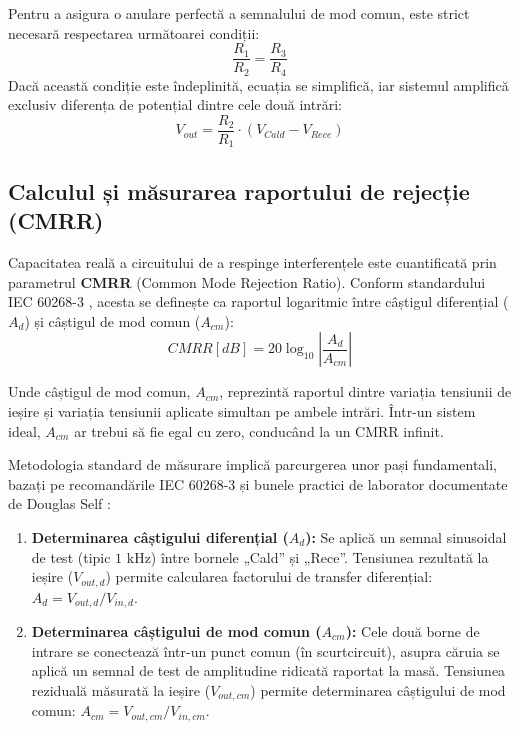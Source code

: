 Pentru a asigura o anulare perfectă a semnalului de mod comun, este strict necesară respectarea următoarei condiții:
\begin{equation}
    \frac{R_1}{R_2} = \frac{R_3}{R_4}
\end{equation}
Dacă această condiție este îndeplinită, ecuația se simplifică, iar sistemul amplifică exclusiv diferența de potențial dintre cele două intrări:
\begin{equation}
    V_{out} = \frac{R_2}{R_1} \cdot (V_{Cald} - V_{Rece})
\end{equation}

\subsection{Calculul și măsurarea raportului de rejecție (CMRR)}
Capacitatea reală a circuitului de a respinge interferențele este cuantificată prin parametrul \textbf{CMRR} (Common Mode Rejection Ratio). Conform standardului IEC 60268-3 \cite{iec60268_3}, acesta se definește ca raportul logaritmic între câștigul diferențial ($A_d$) și câștigul de mod comun ($A_{cm}$):
\begin{equation}
    CMRR [dB] = 20 \log_{10} \left| \frac{A_d}{A_{cm}} \right|
\end{equation}

Unde câștigul de mod comun, $A_{cm}$, reprezintă raportul dintre variația tensiunii de ieșire și variația tensiunii aplicate simultan pe ambele intrări. Într-un sistem ideal, $A_{cm}$ ar trebui să fie egal cu zero, conducând la un CMRR infinit.

Metodologia standard de măsurare implică parcurgerea unor pași fundamentali, bazați pe recomandările IEC 60268-3 \cite{iec60268_3} și bunele practici de laborator documentate de Douglas Self \cite{douglasself}:
\begin{enumerate}
    \item \textbf{Determinarea câștigului diferențial ($A_d$):} Se aplică un semnal sinusoidal de test (tipic $1\text{ kHz}$) între bornele „Cald” și „Rece”. Tensiunea rezultată la ieșire ($V_{out,d}$) permite calcularea factorului de transfer diferențial: $A_d = V_{out,d} / V_{in,d}$.
    \item \textbf{Determinarea câștigului de mod comun ($A_{cm}$):} Cele două borne de intrare se conectează într-un punct comun (în scurtcircuit), asupra căruia se aplică un semnal de test de amplitudine ridicată raportat la masă. Tensiunea reziduală măsurată la ieșire ($V_{out,cm}$) permite determinarea câștigului de mod comun: $A_{cm} = V_{out,cm} / V_{in,cm}$.
\end{enumerate}

